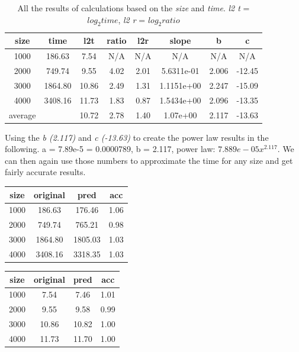 \documentclass[12pt]{article}
\begin{document}
\begin{table}[h]
    \centering
    \caption{\small{All the results of calculations based on the \emph{size} and \emph{time}. \emph{l2 t} = \emph{$log_2 time$}, \emph{l2 r} = \emph{$log_2 ratio$}}}
    \begin{tabular}{|c|c|c|c|c|c|c|c|}
        \hline size &	time &	l2t &	ratio &	l2r &	slope &	b &	c \\
        \hline 1000 &	186.63 &	7.54 &	N/A &	N/A &	N/A &	N/A &	N/A \\
        \hline 2000 &	749.74 &	9.55 &	4.02 &	2.01 &	5.6311e-01 &	2.006 &	-12.45 \\
        \hline 3000 &	1864.80 &	10.86 &	2.49 &	1.31 &	1.1151e+00 &	2.247 &	-15.09 \\
        \hline 4000 &	3408.16 &	11.73 &	1.83 &	0.87 &	1.5434e+00 &	2.096 &	-13.35 \\
        \hline average &	& 10.72 &	2.78 &	1.40 &	1.07e+00 &	2.117 &	-13.63 \\
        \hline
    \end{tabular}
\end{table}

Using the \emph{b (2.117)} and \emph{c (-13.63)} to create the power law results in the following.
a = 7.89e-5 = 0.0000789, b = 2.117, power law: $7.889e-05x^2.117$. We can then again use those numbers
to approximate the time for any size and get fairly accurate results.

\begin{minipage}{0.48\textwidth}
    \begin{tabular}{|c|c|c|c|}
        \hline size & original & pred & acc \\
        \hline 1000 & 186.63 & 176.46 & 1.06 \\
        \hline 2000 & 749.74& 765.21 & 0.98 \\
        \hline 3000 & 1864.80& 1805.03 & 1.03 \\
        \hline 4000 & 3408.16& 3318.35 & 1.03 \\
        \hline
    \end{tabular}
\end{minipage}
\begin{minipage}{0.48\textwidth}
    \begin{tabular}{|c|c|c|c|}
        \hline size & original & pred & acc \\
        \hline 1000 & 7.54& 7.46 & 1.01 \\
        \hline 2000 & 9.55& 9.58 & 0.99 \\
        \hline 3000 & 10.86 & 10.82 & 1.00 \\
        \hline 4000 & 11.73& 11.70 & 1.00 \\
        \hline
    \end{tabular}
\end{minipage}
\end{document}
